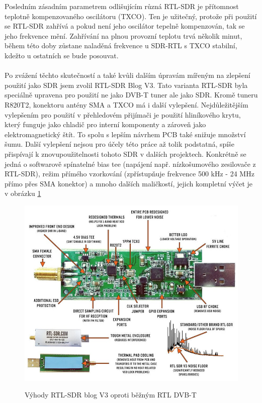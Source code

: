 \documentclass{ctuthesis}
\begin{document}
Posledním zásadním parametrem odlišujícím různá RTL-SDR je přítomnost teplotně kompenzovaného oscilátoru (TXCO). Ten je užitečný, protože při použití se RTL-SDR zahřívá a pokud není jeho oscilátor tepelně kompenzován, tak se jeho frekvence mění. Zahřívání na plnou provozní teplotu trvá několik minut, během této doby zůstane naladěná frekvence u SDR-RTL s TXCO stabilní, kdežto u ostatních se bude posouvat.\\
\\ Po zvážení těchto skutečností a také kvůli dalším úpravám mířeným na zlepšení použití jako SDR jsem zvolil RTL-SDR Blog V3. Tato varianta RTL-SDR byla speciálně upravena pro použití ne jako DVB-T tuner ale jako SDR. Kromě tuneru R820T2, konektoru antény SMA a TXCO má i další vylepšení. Nejdůležitějším vylepšením pro použití v přehledovém přijímači je použití hliníkového krytu, který funguje jako chladič pro interní komponenty a zároveň jako elektromagnetický štít. To spolu s lepším návrhem PCB také snižuje množství šumu. Další vylepšení nejsou pro účely této práce až tolik podstatná, spíše přispívají k znovupoužitelnosti tohoto SDR v dalších projektech. Konkrétně se jedná o softwarově spínatelné bias tee (napájení např. nízkošumového zesilovače z RTL-SDR), režim přímého vzorkování (zpřístupňuje frekvence 500 kHz - 24 MHz přímo přes SMA konektor) a mnoho dalších maličkostí, jejich kompletní výčet je v obrázku \ref{rtl_better}
\begin{figure}
\caption{Výhody RTL-SDR blog V3 oproti běžným RTL DVB-T \cite{rtlsdrcom}}
\includegraphics[width=1\textwidth]{./images/rtlsdr_v3_better.jpg}
\label{rtl_better}
\end{figure}
\end{document}
